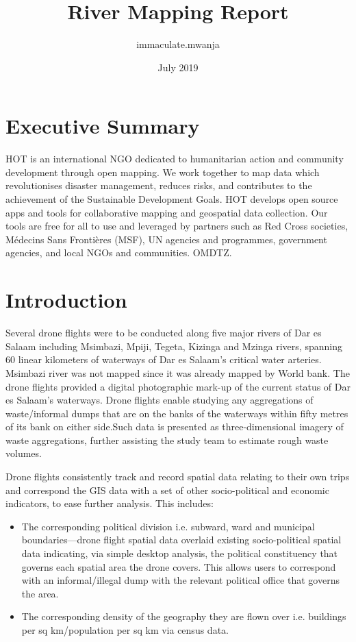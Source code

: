 \documentclass[a4paper,12pt,twoside]{article}
\title{River Mapping Report}
\author{immaculate.mwanja }
\date{July 2019}
\begin{document}
\maketitle

\newpage
\tableofcontents

\newpage
\section{Executive Summary}
\begin{multicols}{2}
HOT is an international NGO dedicated to humanitarian action and community development through open mapping. We work together to map data which revolutionises disaster management, reduces risks, and contributes to the achievement of the Sustainable Development Goals.
HOT develops open source apps and tools for collaborative mapping and geospatial data collection. Our tools are free for all to use and leveraged by partners such as Red Cross societies, Médecins Sans Frontières (MSF), UN agencies and programmes, government agencies, and local NGOs and communities.
OMDTZ.

\end{multicols}


\section{Introduction}

Several drone flights were to be  conducted along five major rivers of Dar es Salaam including  Msimbazi, Mpiji, Tegeta, Kizinga and Mzinga rivers, spanning 60 linear kilometers of waterways of Dar es Salaam’s critical water arteries. Msimbazi river was not mapped since it  was  already mapped by World bank. The drone flights provided a digital photographic mark-up of the current status of Dar es Salaam’s waterways.   
Drone flights enable studying any aggregations of waste/informal dumps that are on the banks of the waterways within fifty metres of its bank on either side.Such data is presented as three-dimensional imagery of waste aggregations, further assisting the study team to estimate rough waste volumes.

Drone flights consistently track and record spatial data relating to their own trips and correspond the GIS data with a set of other socio-political and economic indicators, to ease further analysis. This includes:   

\begin{itemize}
    \item The corresponding political division i.e. subward, ward and municipal boundaries—drone flight spatial data overlaid existing socio-political spatial data indicating, via simple desktop analysis, the political constituency that governs each spatial area the drone covers. This allows users to correspond with an informal/illegal dump with the relevant political office that governs the area.
    \item The corresponding density of the geography they are flown over i.e. buildings per sq km/population per sq km via census data. 
\end{itemize}
\end{document}
